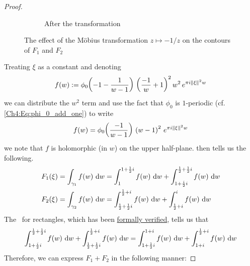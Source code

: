 \begin{proof}
\begin{figure}[htb]
\begin{subfigure}{0.4\linewidth}
            \caption{After the transformation}
        \end{subfigure}
        \caption{The effect of the Möbius transformation $z \mapsto -1/z$ on the contours of $F_1$ and $F_2$}
        \label{Ch4:Fig:Eigenfunction_Mobius_Contours}
    \end{figure}
    Treating $\xi$ as a constant and denoting
    \begin{align*}
        f(w) := \phi_0\!\left( -1 - \frac{1}{w - 1} \right) \, \left( \frac{-1}{w} + 1 \right)^2 w^2 \, e^{\pi i \left\lVert \xi \right\rVert^2 w}
    \end{align*}
    we can distribute the $w^2$ term and use the fact that $\phi_0$ is $1$-periodic (cf. \eqref{Ch4:Eq:phi_0_add_one}) to write
    \begin{align*}
        f(w) = \phi_0\!\left( \frac{-1}{w - 1} \right) \, \left( w - 1 \right)^2 \, e^{\pi i \left\lVert \xi \right\rVert^2 w}
    \end{align*}
    we note that $f$ is holomorphic (in $w$) on the upper half-plane.  then tells us the following.
    \begin{align*}
        F_1\of{\xi}
        &= \int_{\gamma_1} f(w) \, \diff{w}
        = \int_{1}^{1 + \frac{1}{2}i} f(w) \, \diff{w}
        + \int_{1 + \frac{i}{2}i}^{\frac{1}{2} + \frac{1}{2}i} f(w) \, \diff{w} \\
        F_2\of{\xi}
        &= \int_{\gamma_2} f(w) \, \diff{w}
        = \int_{\frac{1}{2} + \frac{1}{2}i}^{\frac{1}{2} + i} f(w) \, \diff{w}
        + \int_{\frac{1}{2} + i}^{i} f(w) \, \diff{w}
    \end{align*}
    The \CGT\ for rectangles, which has been \href{https://github.com/leanprover-community/mathlib4/blob/88928cefd7edb1ba61623bffd4e86389dfe1f648/Mathlib/Analysis/Complex/CauchyIntegral.lean#L245}{formally verified}, tells us that
    \begin{align*}
        \int_{1 + \frac{i}{2}i}^{\frac{1}{2} + \frac{1}{2}i} f(w) \, \operatorname{d}\!{w}
        + \int_{\frac{1}{2} + \frac{1}{2}i}^{\frac{1}{2} + i} f(w) \, \operatorname{d}\!{w}
        = \int_{1 + \frac{1}{2}i}^{1+i} f(w) \, \operatorname{d}\!{w}
        + \int_{1+i}^{\frac{1}{2} + i} f(w) \, \operatorname{d}\!{w}
    \end{align*}
    Therefore, we can express $F_1 + F_2$ in the following manner:

\end{proof}
